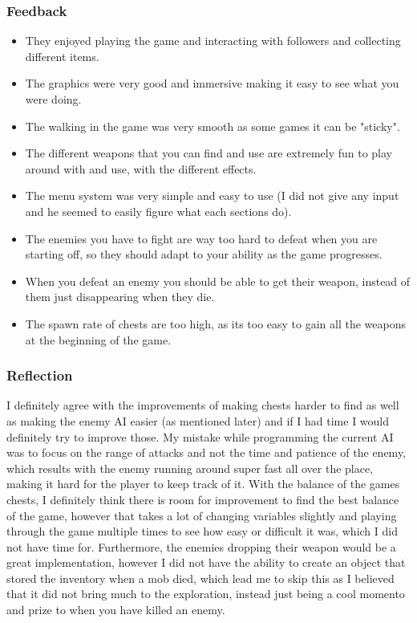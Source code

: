 \documentclass[../Main.tex]{subfiles}
\begin{document}
        \subsubsection{Feedback}
            \begin{itemize}
                \item They enjoyed playing the game and interacting with followers and collecting different items.
                \item The graphics were very good and immersive making it easy to see what you were doing.
                \item The walking in the game was very smooth as some games it can be "sticky".
                \item The different weapons that you can find and use are extremely fun to play around with and use, with the different effects.
                \item The menu system was very simple and easy to use (I did not give any input and he seemed to easily figure what each sections do).
                \item The enemies you have to fight are way too hard to defeat when you are starting off, so they should adapt to your ability as the game progresses.
                \item When you defeat an enemy you should be able to get their weapon, instead of them just disappearing when they die.
                \item The spawn rate of chests are too high, as its too easy to gain all the weapons at the beginning of the game.
            \end{itemize}
        \subsubsection{Reflection}
            I definitely agree with the improvements of making chests harder to find as well as making the enemy AI easier (as mentioned later) and if I had time I would definitely try to improve those. My mistake while programming the current AI was to focus on the range of attacks and not the time and patience of the enemy, which results with the enemy running around super fast all over the place, making it hard for the player to keep track of it. With the balance of the games chests, I definitely think there is room for improvement to find the best balance of the game, however that takes a lot of changing variables slightly and playing through the game multiple times to see how easy or difficult it was, which I did not have time for. Furthermore, the enemies dropping their weapon would be a great implementation, however I did not have the ability to create an object that stored the inventory when a mob died, which lead me to skip this as I believed that it did not bring much to the exploration, instead just being a cool momento and prize to when you have killed an enemy.
\end{document}
